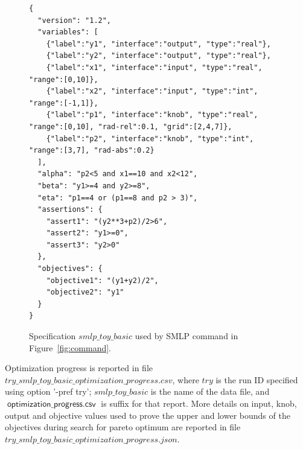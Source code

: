 \documentclass[a4paper,parskip=half]{article} %
\newcommand*\suffix[1]{\operatorname{\mathsf{#1}}} %
\begin{document}
\begin{figure}%
\small
\begin{verbatim}
{
  "version": "1.2",
  "variables": [
    {"label":"y1", "interface":"output", "type":"real"},
    {"label":"y2", "interface":"output", "type":"real"},
    {"label":"x1", "interface":"input", "type":"real", "range":[0,10]},
    {"label":"x2", "interface":"input", "type":"int", "range":[-1,1]},
    {"label":"p1", "interface":"knob", "type":"real", "range":[0,10], "rad-rel":0.1, "grid":[2,4,7]},
    {"label":"p2", "interface":"knob", "type":"int", "range":[3,7], "rad-abs":0.2}
  ],
  "alpha": "p2<5 and x1==10 and x2<12",
  "beta": "y1>=4 and y2>=8",
  "eta": "p1==4 or (p1==8 and p2 > 3)",
  "assertions": {
    "assert1": "(y2**3+p2)/2>6",
    "assert2": "y1>=0",
    "assert3": "y2>0"
  },
  "objectives": {
    "objective1": "(y1+y2)/2",
    "objective2": "y1"
  }
}
\end{verbatim}
\vspace*{-1\baselineskip}
\caption{Specification $smlp\_toy\_basic$ used by SMLP command in Figure~\cref{fig:command}.}
\label{fig:spec}
\end{figure}


Optimization progress is reported in  file $try\_smlp\_toy\_basic\_optimization\_progress.csv$, where $try$ is the run ID specified using option '-pref try'; $smlp\_toy\_basic$ is the name of the data file, and $\suffix{optimization\_progress.csv}$ is suffix for that report. More details on input, knob, output and objective values used to prove the upper and lower bounds of the objectives during search for pareto optimum are reported in file $try\_smlp\_toy\_basic\_optimization\_progress.json$. 
\end{document}
